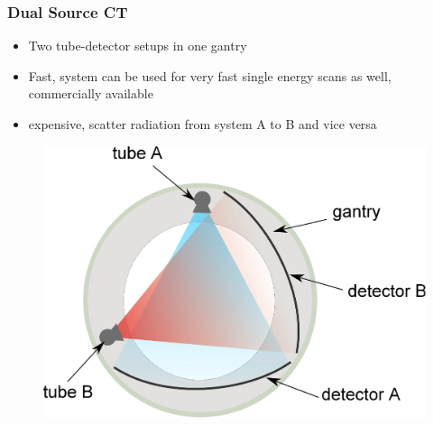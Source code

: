 \begin{frame}
\begin{columns}[c, onlytextwidth]
\begin{column}{0.33\textwidth}
        \end{column}
    \end{columns}%
\end{frame}


\begin{frame}
    \frametitle{Dual Source CT}
    \begin{itemize}
        \item Two tube-detector setups in one gantry
        \item {} Fast, system can be used for very fast single energy scans as well, commercially available
        \item {} expensive, scatter radiation from system A to B and vice versa
    \end{itemize}
    \begin{figure}
        \includegraphics[height=0.6\textheight]{images/duals.eps}
    \end{figure}
\end{frame}

